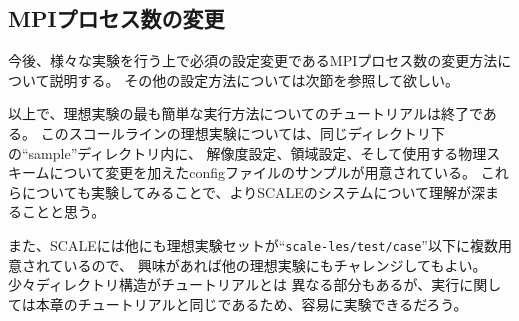 
\subsection{MPIプロセス数の変更}
今後、様々な実験を行う上で必須の設定変更であるMPIプロセス数の変更方法について説明する。
その他の設定方法については次節を参照して欲しい。



以上で、理想実験の最も簡単な実行方法についてのチュートリアルは終了である。
このスコールラインの理想実験については、同じディレクトリ下の``sample''ディレクトリ内に、
解像度設定、領域設定、そして使用する物理スキームについて変更を加えたconfigファイルのサンプルが用意されている。
これらについても実験してみることで、よりSCALEのシステムについて理解が深まることと思う。

また、SCALEには他にも理想実験セットが``\verb|scale-les/test/case|''以下に複数用意されているので、
興味があれば他の理想実験にもチャレンジしてもよい。少々ディレクトリ構造がチュートリアルとは
異なる部分もあるが、実行に関しては本章のチュートリアルと同じであるため、容易に実験できるだろう。





